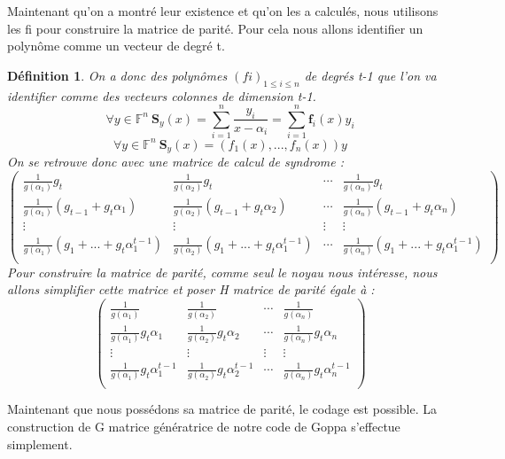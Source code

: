 \documentclass{article}
\newtheorem{defi}{Définition}
\begin{document}
		Maintenant qu'on a montré leur existence et qu'on les a calculés, nous utilisons les fi pour construire la matrice de parité.
		Pour cela nous allons identifier un polynôme comme un vecteur de degré t.

		\begin{defi}
			On a donc des polynômes $(fi)_{1\leq i \leq n}$ de degrés t-1 que l'on va identifier comme des vecteurs colonnes de dimension t-1.
			$$ \forall y \in \mathbb{F}^{n} \ \mathbf{S}_{y}(x) = \sum_{i=1}^{n} \frac{y_{i}}{x-\alpha_{i}} = \sum_{i=1}^{n} \mathbf{f}_{i}(x)y_{i}$$
			$$ \forall y \in \mathbb{F}^{n} \  \mathbf{S}_{y}(x) =(f_{1}(x), ... , f_{n}(x))y $$
			On se retrouve donc avec une matrice de calcul de syndrome :
			$$ 
			\begin{pmatrix}
				\frac{1}{g(\alpha_{1})}g_{t} &  \frac{1}{g(\alpha_{2})}g_{t} & \cdots &  \frac{1}{g(\alpha_{n})}g_{t} \\
				\frac{1}{g(\alpha_{1})}(g_{t-1} + g_{t}\alpha_{1}) &  \frac{1}{g(\alpha_{2})}(g_{t-1} + g_{t}\alpha_{2}) & \cdots &  \frac{1}{g(\alpha_{n})}(g_{t-1} + g_{t}\alpha_{n}) \\
				\vdots & \vdots & \vdots & \vdots\\
				\frac{1}{g(\alpha_{1})}(g_{1} + ... +g_{t}\alpha_{1}^{t-1}) &  \frac{1}{g(\alpha_{2})}(g_{1} + ... +g_{t}\alpha_{1}^{t-1}) & \cdots &  \frac{1}{g(\alpha_{n})}(g_{1} + ... +g_{t}\alpha_{1}^{t-1}) \\
			\end{pmatrix}
			$$
			Pour construire la matrice de parité, comme seul le noyau nous intéresse, nous allons simplifier cette matrice et poser H matrice de parité égale à :
			$$
			\begin{pmatrix}
				\frac{1}{g(\alpha_{1})} &  \frac{1}{g(\alpha_{2})} & \cdots &  \frac{1}{g(\alpha_{n})} \\
				\frac{1}{g(\alpha_{1})}g_{t}\alpha_{1} &  \frac{1}{g(\alpha_{2})}g_{t}\alpha_{2} & \cdots &  \frac{1}{g(\alpha_{n})}g_{t}\alpha_{n}\\
				\vdots & \vdots & \vdots & \vdots\\
				\frac{1}{g(\alpha_{1})}g_{t}\alpha_{1}^{t-1} &  \frac{1}{g(\alpha_{2})}g_{t}\alpha_{2}^{t-1} & \cdots &  \frac{1}{g(\alpha_{n})}g_{t}\alpha_{n}^{t-1} \\
			\end{pmatrix}
			$$
		\end{defi}

		Maintenant que nous possédons sa matrice de parité, le codage est possible. 
		La construction de G matrice génératrice de notre code de Goppa s'effectue simplement.
\end{document}
